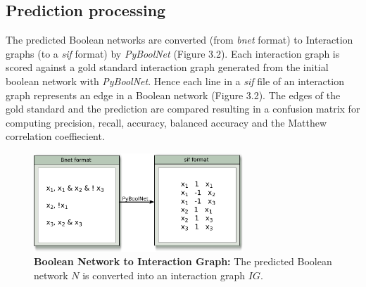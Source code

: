 \subsection*{Prediction processing}

The predicted Boolean networks are converted (from \textit{bnet} format) to Interaction graphs (to a \textit{sif} format) by \textit{PyBoolNet} (Figure 3.2). Each interaction graph is scored against a gold standard interaction graph generated from the initial boolean network with \textit{PyBoolNet}. Hence each line in a \textit{sif} file of an interaction graph represents an edge in a Boolean network (Figure 3.2). The edges of the gold standard and the prediction are compared resulting in a confusion matrix for computing precision, recall, accuracy, balanced accuracy and the Matthew correlation coeffiecient.

\begin{figure}[H]
\centering
\includegraphics[width=0.7\textwidth]{./Bilder/bnet2sif.pdf}
\caption[Boolean Network to Interaction Graph]{\textbf{Boolean Network to Interaction Graph:} The predicted Boolean network $N$ is converted into an interaction graph $IG$.}
\label{fig:9}
\end{figure}

 

